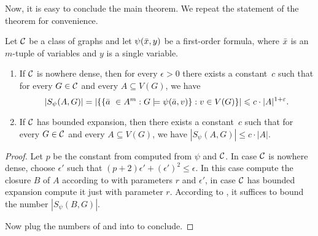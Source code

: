 Now, it is easy to conclude the main theorem. We repeat the statement of the theorem 
for convenience.

\setcounter{theorem}{3}
\begin{theorem}
Let $\mathcal{C}$ be a class of graphs and let $\psi(\bar{x},y)$ be a first-order formula, where 
$\bar{x}$ is an $m$-tuple of variables and $y$ is a single variable. 
\begin{enumerate}
\item If $\mathcal{C}$ is nowhere dense, then for every $\epsilon>0$ 
there exists a constant~$c$ such that for every $G\in \mathcal{C}$ and every
$A\subseteq V(G)$, we have 
\[|S_\psi(A,G)|=|\{\{\bar{a}\ \in A^m : G\models\psi(\bar{a},v)\} : v\in V(G)\}|\leqslant c\cdot |A|^{1+\varepsilon}.\]
\item If $\mathcal{C}$ has bounded expansion, then there exists a constant~$c$ such that for every $G\in \mathcal{C}$ and every $A\subseteq V(G)$, we have $|S_\psi(A,G)|\leq c\cdot |A|$.
\end{enumerate}
\end{theorem}
\begin{proof}
Let $p$ be the constant from  computed
from $\psi$ and $\mathcal{C}$. In case $\mathcal{C}$ is nowhere dense, choose
$\epsilon'$ such that $(p+2)\epsilon'+(\epsilon')^2\leq \epsilon$. In this case 
compute the closure $B$ of $A$ according to  with 
parameters $r$ and $\epsilon'$, in case $\mathcal{C}$ has bounded expansion 
compute it just with parameter $r$. 
According to , it suffices to bound the
number $|S_\psi(B,G)|$. 

Now plug the numbers of  and  
into  to conclude. 
\end{proof}